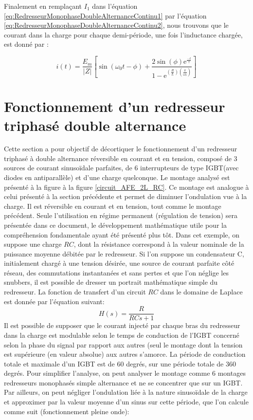 Finalement en remplaçant $I_1$ dans l'équation \ref{eq:RedresseurMonophaseDoubleAlternanceContinu1} par l'équation \ref{eq:RedresseurMonophaseDoubleAlternanceContinu2}, nous trouvons que le courant dans la charge pour chaque demi-période, une fois l'inductance chargée, est donné par :

\begin{equation}
	i(t) = \frac{E_m}{|Z|}\left[\sin{(\omega_0 t - \phi)} + \frac{2\sin(\phi) \mbox{e}^{\frac{-t}{\tau}}}{1-\mbox{e}^{\left(\frac{R}{L}\right)\left(\frac{\pi}{\omega_0}\right)}} \right] 
\end{equation}

\section{Fonctionnement d'un redresseur triphasé double alternance}
Cette section a pour objectif de décortiquer le fonctionnement d'un redresseur triphasé à double alternance réversible en courant et en tension, composé de 3 sources de courant sinusoïdale parfaites, de 6 interrupteurs de type IGBT(avec diodes en antiparallèle) et d'une charge quelconque. Le montage analysé est présenté à la figure à la figure \ref{circuit_AFE_2L_RC}. Ce montage est analogue à celui présenté à la section précédente et permet de diminuer l'ondulation vue à la charge. Il est réversible en courant et en tension, tout comme le montage précédent. Seule l'utilisation en régime permanent (régulation de tension) sera présentée dans ce document, le développement mathématique utile pour la compréhension fondamentale ayant été présenté plus tôt. Dans cet exemple, on suppose une charge $RC$, dont la résistance correspond à la valeur nominale de la puissance moyenne débitée par le redresseur. Si l'on suppose un condensateur C, initialement chargé à une tension désirée, une source de courant parfaite côté réseau, des commutations instantanées et sans pertes et que l'on néglige les snubbers, il est possible de dresser un portrait mathématique simple du redresseur. La fonction de transfert d'un circuit $RC$ dans le domaine de Laplace est donnée par l'équation suivant:
\begin{equation}
H(s) = \frac{R}{RCs + 1}
\end{equation}
Il est possible de supposer que le courant injecté par chaque bras du redresseur dans la charge est modulable selon le temps de conduction de l'IGBT concerné selon la phase du signal par rapport aux autres (seul le montage dont la tension est supérieure (en valeur absolue) aux autres s'amorce. La période de conduction totale et maximale d'un IGBT est de 60 degrés, sur une période totale de 360 degrés. Pour simplifier l'analyse, on peut analyser le montage comme 6 montages redresseurs monophasés simple alternance et ne se concentrer que sur un IGBT. Par ailleurs, on peut négliger l'ondulation liée à la nature sinusoïdale de la charge et approximer par la valeur moyenne d'un sinus sur cette période, que l'on calcule comme suit (fonctionnement pleine onde):
